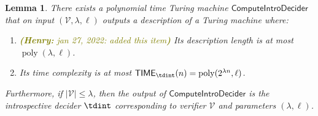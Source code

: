 \documentclass[11pt]{article}
\newtheorem{lemma}[theorem]{Lemma}
\theoremstyle{definition}
\DeclareMathOperator{\poly}{poly}
\newcommand{\verifier}{\mathcal{V}}
\newcommand{\TIME}{\mathsf{TIME}}
\newcommand{\tmstyle}[1]{\ensuremath{\mathsf{#1}}}
\newcommand{\ComputeIntroDecider}{\tmstyle{ComputeIntroDecider}}
\newcommand{\hnote}[1]{\textcolor{olive}{\small {\textbf{(Henry:} #1\textbf{) }}}}
\newcommand{\hnote}[1]{}
\begin{document}
\begin{lemma}
  \label{lem:intro-decider-complexity}
  There exists a polynomial time Turing machine $\ComputeIntroDecider$ that
  on input $(\verifier, \lambda, \ell)$ outputs a description of a Turing machine where:
  \begin{enumerate}
  		\item   \hnote{jan 27, 2022: added this item} Its description length is at most $\poly(\lambda, \ell)$.
		\item Its time complexity is at most $\TIME_{\tdint}(n) = \poly(2^{\lambda n} , \ell)$.
  \end{enumerate}
  Furthermore, if $|\verifier| \leq \lambda$, then the output of $\ComputeIntroDecider$ is the introspective decider 
  $\tdint$ corresponding to verifier $\verifier$ and parameters $(\lambda,\ell)$. 
\end{lemma}
\end{document}
